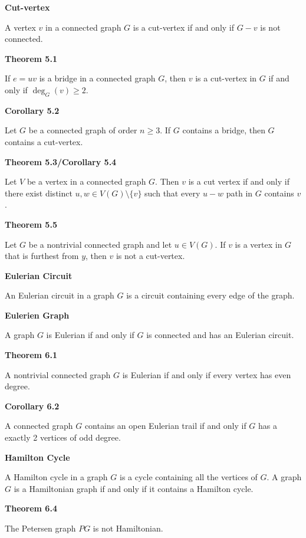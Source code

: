 \documentclass{article}
\begin{document}
\medskip\noindent\textbf{Cut-vertex}

    A vertex $v$ in a connected graph $G$ is a cut-vertex if and only if $G - v$ is not connected.

\medskip\noindent\textbf{Theorem 5.1}

    If $e=uv$ is a bridge in a connected graph $G$, then $v$ is a cut-vertex in $G$ if and only if $\deg_G(v) \geq 2$.

\medskip\noindent\textbf{Corollary 5.2}

    Let $G$ be a connected graph of order $n \geq 3$.
    If $G$ contains a bridge, then $G$ contains a cut-vertex.

\medskip\noindent\textbf{Theorem 5.3/Corollary 5.4}

    Let $V$ be a vertex in a connected graph $G$. Then $v$ is a cut vertex if and only if there exist distinct $u,w \in V(G) \setminus \{v\}$ such that every $u-w$ path in $G$ contains $v$.

\medskip\noindent\textbf{Theorem 5.5}

    Let $G$ be a nontrivial connected graph and let $u \in V(G)$. If $v$ is a vertex in $G$ that is furthest from $y$, then $v$ is not a cut-vertex.

\medskip\noindent\textbf{Eulerian Circuit}

    An Eulerian circuit in a graph $G$ is a circuit containing every edge of the graph.

\medskip\noindent\textbf{Eulerien Graph}

    A graph $G$ is Eulerian if and only if $G$ is connected and has an Eulerian circuit.

\medskip\noindent\textbf{Theorem 6.1}

    A nontrivial connected graph $G$ is Eulerian if and only if every vertex has even degree.

\medskip\noindent\textbf{Corollary 6.2}

    A connected graph $G$ contains an open Eulerian trail if and only if $G$ has a exactly 2 vertices of odd degree.

\medskip\noindent\textbf{Hamilton Cycle}

    A Hamilton cycle in a graph $G$ is a cycle containing all the vertices of $G$.
    A graph $G$ is a Hamiltonian graph if and only if it contains a Hamilton cycle.

\medskip\noindent\textbf{Theorem 6.4}

    The Petersen graph $PG$ is not Hamiltonian.
\end{document}
